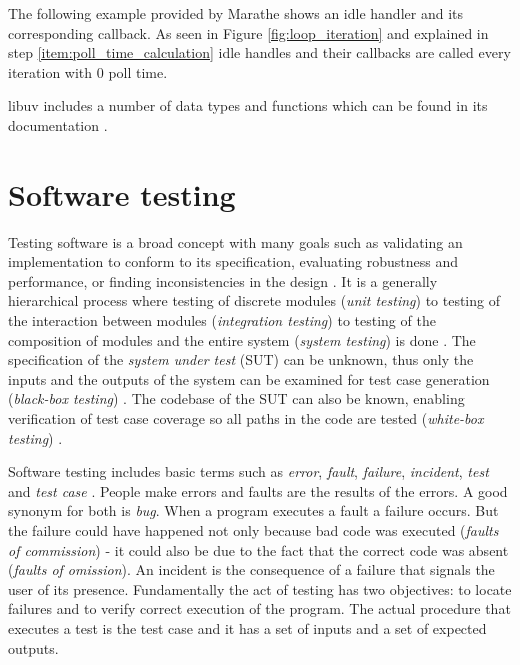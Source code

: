 The following example provided by Marathe \cite{uvbook} shows an idle handler
and its corresponding callback. As seen in Figure \ref{fig:loop_iteration} and
explained in step \ref{item:poll_time_calculation} idle handles and their
callbacks are called every iteration with 0 poll time.



libuv includes a number of data types and functions which can be found in its
documentation \cite{libuv-docs}.

\section{Software testing}

Testing software is a broad concept with many goals such as validating an
implementation to conform to its specification, evaluating robustness and
performance, or finding inconsistencies in the design
\cite{bertolino2007software}. It is a generally hierarchical process where
testing of discrete modules (\textit{unit testing}) to testing of the
interaction between modules (\textit{integration testing}) to testing of the
composition of modules and the entire system (\textit{system testing}) is done
\cite{raymond1998automatic}. The specification of the \textit{system under
test} (SUT) can be unknown, thus only the inputs and the outputs of the system
can be examined for test case generation (\textit{black-box testing})
\cite{jorgensen2016software}. The codebase of the SUT can also be known,
enabling verification of test case coverage so all paths in the code are tested
(\textit{white-box testing}) \cite{jorgensen2016software}.

Software testing includes basic terms such as \textit{error}, \textit{fault},
\textit{failure}, \textit{incident}, \textit{test} and \textit{test case}
\cite{radatz1990ieee}. People make errors and faults are the results of the
errors. A good synonym for both is \textit{bug}. When a program executes a
fault a failure occurs. But the failure could have happened not only because
bad code was executed (\textit{faults of commission}) - it could also be due to
the fact that the correct code was absent (\textit{faults of omission}). An
incident is the consequence of a failure that signals the user of its presence.
Fundamentally the act of testing has two objectives: to locate failures and to
verify correct execution of the program.  The actual procedure that executes a
test is the test case and it has a set of inputs and a set of expected outputs.
\cite{jorgensen2016software}

